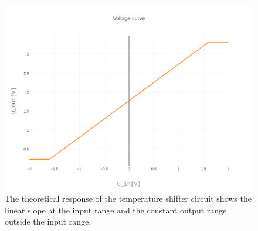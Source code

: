 \documentclass[12pt]{scrartcl}
\begin{document}
      \begin{figure}[H]
        \includegraphics[width = \textwidth]{./plots/plot_image.pdf}
        \caption{The theoretical response of the temperature shifter circuit
        shows the linear slope at the input range and the constant output range
        outside the input range.}
        \label{fig2}
      \end{figure}
\end{document}
